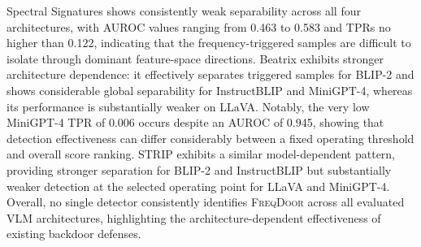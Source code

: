 \documentclass[lettersize,journal]{IEEEtran}
\begin{document}
Spectral Signatures shows consistently weak separability across all four architectures, with AUROC values ranging from 0.463 to 0.583 and TPRs no higher than 0.122, indicating that the frequency-triggered samples are difficult to isolate through dominant feature-space directions. Beatrix exhibits stronger architecture dependence: it effectively separates triggered samples for BLIP-2 and shows considerable global separability for InstructBLIP and MiniGPT-4, whereas its performance is substantially weaker on LLaVA. Notably, the very low MiniGPT-4 TPR of 0.006 occurs despite an AUROC of 0.945, showing that detection effectiveness can differ considerably between a fixed operating threshold and overall score ranking. STRIP exhibits a similar model-dependent pattern, providing stronger separation for BLIP-2 and InstructBLIP but substantially weaker detection at the selected operating point for LLaVA and MiniGPT-4. Overall, no single detector consistently identifies \textsc{FreqDoor} across all evaluated VLM architectures, highlighting the architecture-dependent effectiveness of existing backdoor defenses.
\end{document}
